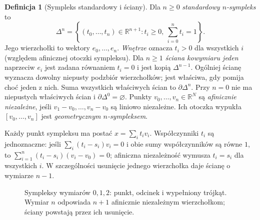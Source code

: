 \documentclass[11pt,a4paper,oneside]{report}
\newcommand{\R}{\mathbb{R}}
\theoremstyle{plain}
\theoremstyle{definition}
\newtheorem{definicja}[twierdzenie]{Definicja}
\theoremstyle{remark}
\begin{document}
\begin{definicja}[Sympleks standardowy i ściany]
\label{def:sympleks-standardowy}
Dla $n\geq0$ \emph{standardowy $n$-sympleks}
to
\[
 \Delta^n=
 \left\{(t_0,\ldots,t_n)\in\R^{n+1}:
 t_i\geq0,\ \sum_{i=0}^{n}t_i=1\right\}.
\]
Jego wierzchołki to wektory $e_0,\ldots,e_n$.
\emph{Wnętrze} oznacza $t_i>0$ dla wszystkich $i$
(względem afinicznej otoczki sympleksu).
Dla $n\geq1$ \emph{ściana kowymiaru jeden} naprzeciw $e_i$
jest zadana równaniem $t_i=0$ i jest kopią $\Delta^{n-1}$.
Ogólniej ścianę wyznacza dowolny niepusty podzbiór wierzchołków;
jest właściwa, gdy pomija choć jeden z nich.
Suma wszystkich właściwych ścian to $\partial\Delta^n$.
Przy $n=0$ nie ma niepustych właściwych ścian i $\partial\Delta^0=\varnothing$.
Punkty $v_0,\ldots,v_n\in\R^N$
są \emph{afinicznie niezależne}, jeśli
$v_1-v_0,\ldots,v_n-v_0$ są liniowo
niezależne. Ich otoczka wypukła
$[v_0,\ldots,v_n]$ jest
\emph{geometrycznym $n$-sympleksem}.
\end{definicja}

Każdy punkt sympleksu ma postać
$x=\sum_i t_iv_i$. Współczynniki
$t_i$ są jednoznaczne: jeśli
$\sum_i(t_i-s_i)v_i=0$ i obie sumy
współczynników są równe $1$, to
$\sum_{i=1}^n(t_i-s_i)(v_i-v_0)=0$;
afiniczna niezależność wymusza
$t_i=s_i$ dla wszystkich $i$.
W szczególności usunięcie jednego
wierzchołka daje ścianę
o wymiarze $n-1$.

\begin{figure}[!htbp]
\centering
{}
\caption{Sympleksy wymiarów $0,1,2$: punkt,
odcinek i wypełniony trójkąt. Wymiar
$n$ odpowiada $n+1$ afinicznie niezależnym
wierzchołkom; ściany powstają przez ich usunięcie.}
\label{fig:sympleks-trojkat}
\end{figure}
\end{document}
